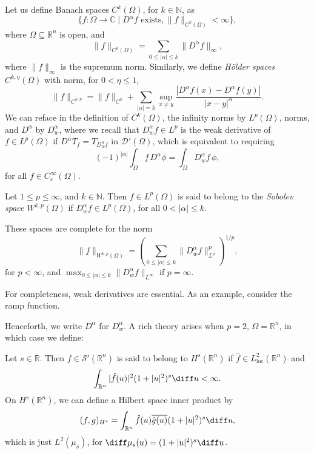 \documentclass[12pt]{article}
\begin{document}
Let us define Banach spaces $C^k(\Omega)$, for $k \in \mathbb{N}$, as
\[
	\{ f: \Omega \to \mathbb{C} \mid D^\alpha f \text{ exists}, \|f\|_{C^k(\Omega)}< \infty\},
\]
where $\Omega \subseteq \mathbb{R}^n$ is open, and
\[
\|f\|_{C^k(\Omega)} = \sum_{0 \leq |\alpha| \leq k} \|D^\alpha f\|_\infty,
\]
where $\|f\|_\infty$ is the supremum norm. Similarly, we define \emph{H\"older spaces} $C^{k,\eta}(\Omega)$ with norm, for $0 < \eta \leq 1$,
\[
\|f\|_{C^{k, \eta}} = \|f\|_{C^k} + \sum_{|\alpha| = k} \sup_{x \neq y} \frac{|D^\alpha f(x) - D^\alpha f(y)|}{|x - y|^\alpha}.
\]
We can reface in the definition of $C^k(\Omega)$, the infinity norms by $L^p(\Omega)$, norms, and $D^\alpha$ by $D^\alpha_w$, where we recall that $D^\alpha_w f \in L^p$ is the weak derivative of $f \in L^p(\Omega)$ if $D^\alpha T_f = T_{D^\alpha_w f}$ in $\mathcal{D}'(\Omega)$, which is equivalent to requiring
\[
	(-1)^{|\alpha|}\int_{\Omega} f \, D^\alpha \phi = \int_{\Omega} D^\alpha_w f \, \phi,
\]
for all $f \in C^\infty_c(\Omega)$.

\begin{definition}
	Let $1 \leq p \leq \infty$, and $k \in \mathbb{N}$. Then $f \in L^p(\Omega)$ is said to belong to the \emph{Sobolev space} $W^{k, p}(\Omega)$ if $D^\alpha_w f \in L^p(\Omega)$, for all $0 < |\alpha| \leq k$.
\end{definition}

These spaces are complete for the norm
\[
\|f\|_{W^{k, p}(\Omega)} = \left( \sum_{0 \leq |\alpha| \leq k} \|D^\alpha_w f\|^p_{L^p} \right)^{1/p},
\]
for $p < \infty$, and $\max_{0 \leq |\alpha| \leq k} \|D^\alpha_w f\|_{L^\infty}$ if $p = \infty$.

\begin{remark}
	For completeness, weak derivatives are essential. As an example, consider the ramp function.
\end{remark}

Henceforth, we write $D^\alpha$ for $D^\alpha_w$. A rich theory arises when $p = 2$, $\Omega= \mathbb{R}^n$, in which case we define:

\begin{definition}
	Let $s \in \mathbb{R}$. Then $f \in \mathcal{S}'(\mathbb{R}^n)$ is said to belong to $H^s(\mathbb{R}^n)$ if $\hat f \in L^2_{\mathrm{loc}}(\mathbb{R}^n)$ and
	\[
	\int_{\mathbb{R}^n} |\hat f(u)|^2 (1 + |u|^2)^s \diff u < \infty.
	\]
	On $H^s(\mathbb{R}^n)$, we can define a Hilbert space inner product by
	\[
		(f, g)_{H^s} = \int_{\mathbb{R}^n} \hat f(u) \overline{\hat g(u)} (1 + |u|^2)^s \diff u,
	\]
	which is just $L^2(\mu_s)$, for $\diff \mu_s(u) = (1 + |u|^2)^s \diff u$.
\end{definition}
\end{document}
